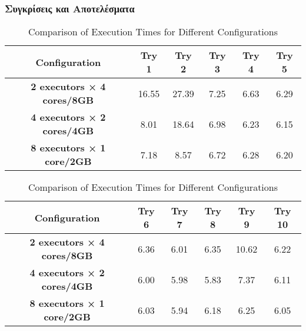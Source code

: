 \documentclass{article}
\begin{document}
\subsubsection*{ Συγκρίσεις και Αποτελέσματα}
\begin{table}[H]
\centering
\caption{Comparison of Execution Times for Different Configurations}
\label{tab:execution_times}
\begin{tabular}{|c|c|c|c|c|c|}
\hline
\textbf{Configuration}	& \textbf{Try 1} & \textbf{Try 2} & \textbf{Try 3} & \textbf{Try 4}  & \textbf{Try 5}\\ \hline
\textbf{2 executors × 4 cores/8GB}   &	16.55	&	27.39	&	7.25	&	6.63	&	6.29	\\ \hline
\textbf{4 executors × 2 cores/4GB}   &	8.01 	&	18.64	&	6.98	&	6.23	&	6.15	\\ \hline
\textbf{8 executors × 1 core/2GB}    &	7.18	&	8.57	&	6.72	&	6.28	&	6.20	\\ \hline
\end{tabular}

\vspace{0.5cm}

\begin{tabular}{|c|c|c|c|c|c|}
\hline
\textbf{Configuration}	& \textbf{Try 6} & \textbf{Try 7} & \textbf{Try 8} & \textbf{Try 9} & \textbf{Try 10} \\ \hline
\textbf{2 executors × 4 cores/8GB}   &	6.36	&	6.01	&	6.35	&	10.62	&	6.22	\\ \hline
\textbf{4 executors × 2 cores/4GB}   &	6.00	&	5.98	&	5.83	&	7.37	&	6.11	\\ \hline
\textbf{8 executors × 1 core/2GB}    &	6.03	&	5.94	&	6.18	&	6.25	&	6.05	\\ \hline
\end{tabular}
\end{table}
\end{document}
